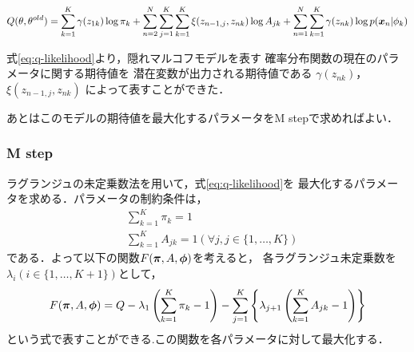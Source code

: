 \begin{align}
  Q(\theta, \theta^{old}) = \sum_{k=1}^K\gamma(z_{1k})\log \pi_k + \sum_{n=2}^N\sum_{j=1}^K\sum_{k=1}^K\xi(z_{n-1,j},z_{nk})\log A_{jk} + \sum_{n=1}^N\sum_{k=1}^K\gamma(z_{nk})\log p(\mbox{\boldmath $x$}_n|\phi_k) \label{eq:q-likelihood}
\end{align}

式\eqref{eq:q-likelihood}より，隠れマルコフモデルを表す
確率分布関数の現在のパラメータに関する期待値を
潜在変数が出力される期待値である
$\gamma(z_{nk})$，$\xi(z_{n-1,j},z_{nk})$
によって表すことができた．

あとはこのモデルの期待値を最大化するパラメータをM stepで求めればよい．

\subsubsection{M step}
\label{sec:Baum-Welch:m-step}
ラグランジュの未定乗数法を用いて，式\eqref{eq:q-likelihood}を
最大化するパラメータを求める．パラメータの制約条件は，
\begin{align}
  &\sum_{k=1}^K\pi_k = 1 \label{eq:pi-constraint}\\
  &\sum_{k=1}^KA_{jk} = 1 (\forall j, j\in \{1,\dots, K\}) \label{eq:A-constraint}
\end{align}
である．よって以下の関数$F(\mbox{\boldmath $\pi$},A,\mbox{\boldmath $\phi$})$を考えると，
各ラグランジュ未定乗数を$\lambda_i (i\in \{1,\dots,K+1\})$として，
\begin{align}
  F(\mbox{\boldmath $\pi$},A,\mbox{\boldmath $\phi$}) = Q - \lambda_1\left(\sum_{k=1}^K\pi_k-1\right) -\sum_{j=1}^K\left\{\lambda_{j+1}\left(\sum_{k=1}^KA_{jk}-1\right)\right\}
\end{align}
という式で表すことができる.この関数を各パラメータに対して最大化する．

